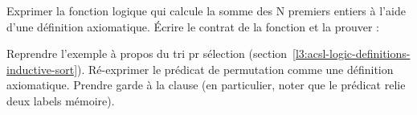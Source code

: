 



Exprimer la fonction logique qui calcule la somme des N premiers entiers à l'aide
d'une définition axiomatique. Écrire le contrat de la fonction 
et la prouver :






Reprendre l'exemple à propos du tri pr sélection
(section~\ref{l3:acsl-logic-definitions-inductive-sort}). Ré-exprimer le
prédicat de permutation comme une définition axiomatique. Prendre garde à la
clause  (en particulier, noter que le prédicat relie deux
labels mémoire).



